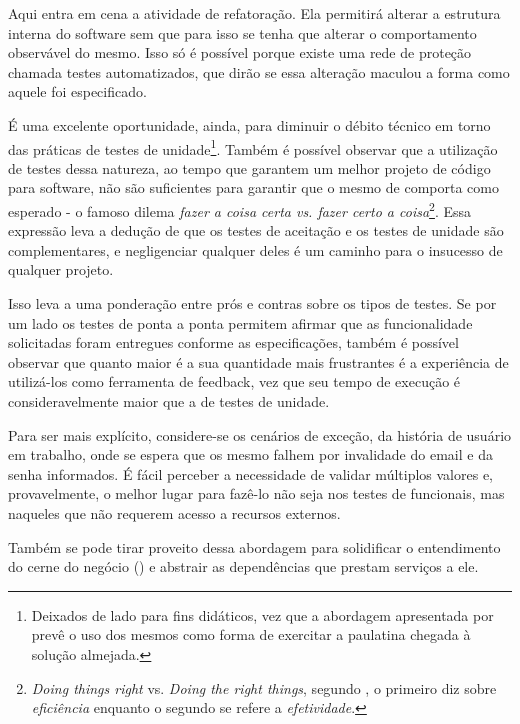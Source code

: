   Aqui entra em cena a atividade de refatoração. Ela permitirá alterar a estrutura interna do software sem que para isso se tenha que alterar o comportamento observável do mesmo. Isso só é possível porque existe uma rede de proteção chamada testes automatizados, que dirão se essa alteração maculou a forma como aquele foi especificado.

  É uma excelente oportunidade, ainda, para diminuir o débito técnico em torno das práticas de testes de unidade\footnote{Deixados de lado para fins didáticos, vez que a abordagem apresentada por  prevê o uso dos mesmos como forma de exercitar a paulatina chegada à solução almejada.}. Também é possível observar que a utilização de testes dessa natureza, ao tempo que garantem um melhor projeto de código para software, não são suficientes para garantir que o mesmo de comporta como esperado - o famoso dilema \emph{fazer a coisa certa vs. fazer certo a coisa}\footnote{\emph{Doing things right} vs. \emph{Doing the right things}, segundo , o primeiro diz sobre \emph{eficiência} enquanto o segundo se refere a \emph{efetividade}.}. Essa expressão leva a dedução de que os testes de aceitação e os testes de unidade são complementares, e negligenciar qualquer deles é um caminho para o insucesso de qualquer projeto.

  Isso leva a uma ponderação entre prós e contras sobre os tipos de testes. Se por um lado os testes de ponta a ponta permitem afirmar que as funcionalidade solicitadas foram entregues conforme as especificações, também é possível observar que quanto maior é a sua quantidade mais frustrantes é a experiência de utilizá-los como ferramenta de feedback, vez que seu tempo de execução é consideravelmente maior que a de testes de unidade.

  Para ser mais explícito, considere-se os cenários de exceção, da história de usuário em trabalho, onde se espera que os mesmo falhem por invalidade do email e da senha informados. É fácil perceber a necessidade de validar múltiplos valores e, provavelmente, o melhor lugar para fazê-lo não seja nos testes de funcionais, mas naqueles que não requerem acesso a recursos externos.

  Também se pode tirar proveito dessa abordagem para solidificar o entendimento do cerne do negócio () e abstrair as dependências que prestam serviços a ele.

